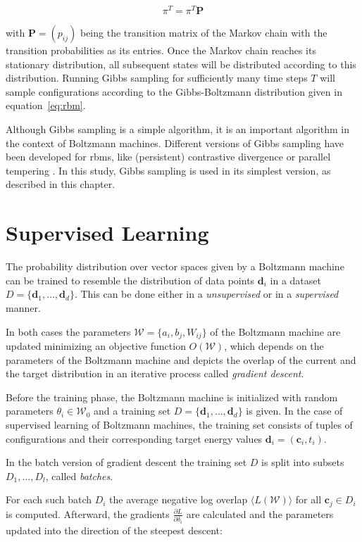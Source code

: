 \begin{equation}
    \pi^T=\pi^T\bm{P}
\end{equation}

with $\bm{P} = (p_{ij})$ being the transition matrix of the Markov chain with the transition probabilities as its entries.
Once the Markov chain reaches its stationary distribution, all subsequent states will be distributed according to this distribution. Running Gibbs sampling for 
sufficiently many time steps $T$ will sample configurations according 
to the Gibbs-Boltzmann distribution given in equation~\ref{eq:rbm}.

Although Gibbs sampling is a simple algorithm, it is an important algorithm in the context of 
Boltzmann machines. Different versions of Gibbs sampling have been developed for \gls{rbm}s, like 
(persistent) contrastive divergence \cite{hinton2002training, tieleman2008training} or parallel tempering \cite{desjardins2010parallel}. In this study,
Gibbs sampling is used in its simplest version, as described in this chapter.
    
\section{Supervised Learning}
\label{sec:learning}
The probability distribution over vector spaces given by a Boltzmann machine can be trained to 
resemble the distribution of data points $\bm{d}_i$ in a dataset $D=\{\bm{d}_1,\dots,\bm{d}_d\}$. This can be done either in a \textit{unsupervised}
or in a \textit{supervised} manner.

In both cases the parameters $\mathcal{W} = \{a_i,b_j,W_{ij}\}$ of the Boltzmann machine are updated minimizing 
an objective function $O(\mathcal{W})$, which depends on the parameters of the Boltzmann machine and 
depicts the overlap of the current and the target distribution in an iterative process called \textit{gradient descent}.

Before the training phase, the Boltzmann machine is initialized with random parameters $\theta_i \in \mathcal{W}_0$ and a training set 
$D=\{\bm{d}_1,\dots,\bm{d}_d\}$ is given. In the case of supervised learning of Boltzmann machines, the training set consists of tuples of configurations and their corresponding target energy values $\bm{d}_i= (\bm{c}_i, t_i)$.

In the batch version of gradient descent the training set $D$ is 
split into subsets $D_1, \dots, D_l$, called \textit{batches}.

For each such batch $D_i$ the average negative log overlap $\langle L(\mathcal{W})\rangle$ for all $\bm{c}_j \in D_i$
is computed. Afterward, the gradients $\frac{\partial L}{\partial \delta_i}$ are calculated and the parameters updated into
the direction of the steepest descent:

